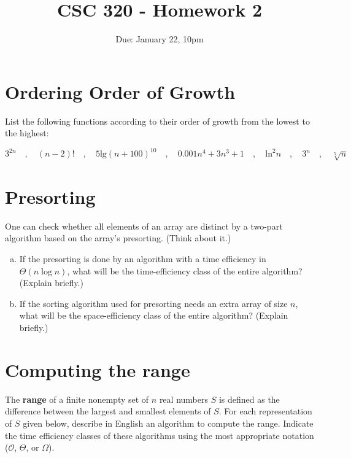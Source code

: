 \documentclass[12pt]{article}
\title{CSC 320 - Homework 2}
\author{}
\date{Due: January 22, 10pm}
\begin{document}
{\small \tableofcontents}




\section{Ordering Order of Growth}

List the following functions according to their order of growth from the lowest to the highest:

\[
    3^{2n} \quad,\quad  (n-2)!  \quad,\quad  5 \textrm{lg}(n+100)^{10}
    \quad,\quad  0.001n^4 + 3n^3 + 1    \quad,\quad      \textrm{ln}^2 n
    \quad,\quad     3^n    \quad,\quad    \sqrt[5]{n}
\]

\vspace{1in}


\section{Presorting}

One can check whether all elements of an array are distinct by a two-part algorithm based on the array's presorting. (Think about it.)

\begin{enumerate}[a.]
    \item If the presorting is done by an algorithm with a time efficiency in
    $\Theta(n \log n)$, what will be the time-efficiency class of the entire algorithm? (Explain briefly.)
    \vspace{1.1in}

    \item If the sorting algorithm used for presorting needs an extra array of size $n$, what will be the space-efficiency class of the entire algorithm? (Explain briefly.)
\end{enumerate}




\clearpage
\section{Computing the range}

The \textbf{range} of a finite nonempty set of $n$ real numbers $S$ is defined as the difference between the largest and smallest elements of $S$. For each representation of $S$ given below, describe in English an algorithm to compute the range. Indicate the time efficiency classes of these algorithms using the most appropriate notation ($\mathcal{O}$, $\Theta$, or $\Omega$).
\end{document}

